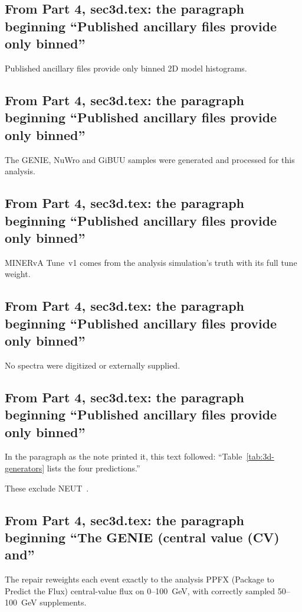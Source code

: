 \subsection{From Part 4, sec3d.tex: the paragraph beginning ``Published ancillary files provide only binned''}
Published ancillary files provide only binned 2D model histograms.

\subsection{From Part 4, sec3d.tex: the paragraph beginning ``Published ancillary files provide only binned''}
The GENIE, NuWro and GiBUU samples were generated and processed for this analysis.

\subsection{From Part 4, sec3d.tex: the paragraph beginning ``Published ancillary files provide only binned''}
MINERvA Tune~v1 comes from the analysis simulation's truth with its full tune weight.

\subsection{From Part 4, sec3d.tex: the paragraph beginning ``Published ancillary files provide only binned''}
No spectra were digitized or externally supplied.

\subsection{From Part 4, sec3d.tex: the paragraph beginning ``Published ancillary files provide only binned''}
In the paragraph as the note printed it, this text followed: ``Table~\ref{tab:3d-generators} lists the four predictions.''\par
These exclude NEUT~\cite{Hayato:2009zz}.

\subsection{From Part 4, sec3d.tex: the paragraph beginning ``The GENIE (central value (CV) and''}
The repair reweights each event exactly to the analysis PPFX (Package to Predict the Flux) central-value flux on 0--\SI{100}{GeV}, with correctly sampled 50--\SI{100}{GeV} supplements.

